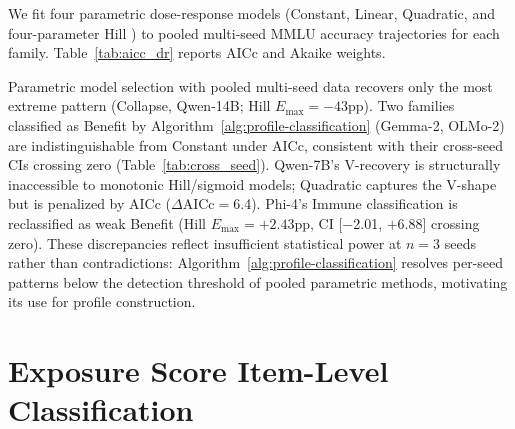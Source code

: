 We fit four parametric dose-response models (Constant, Linear, Quadratic, and four-parameter Hill \citep{hill1910aggregation,ritz2015dose}) to pooled multi-seed MMLU accuracy trajectories for each family. Table~\ref{tab:aicc_dr} reports AICc and Akaike weights.

\begin{table}[h]
\centering
\caption{AICc model selection for dose-response trajectories (pooled multi-seed MMLU). Bold indicates best-fitting model per family; $w$ is the Akaike weight of the best model.}
\label{tab:aicc_dr}
\footnotesize
{}
\end{table}

Parametric model selection with pooled multi-seed data recovers only the most extreme pattern (Collapse, Qwen-14B; Hill $E_{\max} = -43$pp). Two families classified as Benefit by Algorithm~\ref{alg:profile-classification} (Gemma-2, OLMo-2) are indistinguishable from Constant under AICc, consistent with their cross-seed CIs crossing zero (Table~\ref{tab:cross_seed}). Qwen-7B's V-recovery is structurally inaccessible to monotonic Hill/sigmoid models; Quadratic captures the V-shape but is penalized by AICc ($\Delta$AICc$=$6.4). Phi-4's Immune classification is reclassified as weak Benefit (Hill $E_{\max} = +2.43$pp, CI [$-$2.01, $+$6.88] crossing zero). These discrepancies reflect insufficient statistical power at $n\!=\!3$ seeds rather than contradictions: Algorithm~\ref{alg:profile-classification} resolves per-seed patterns below the detection threshold of pooled parametric methods, motivating its use for profile construction.

\section{Exposure Score Item-Level Classification}
\label{sec:sij_classification}

